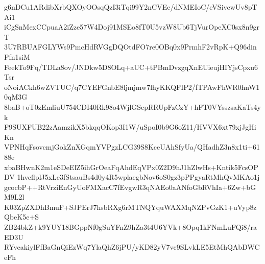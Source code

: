 g6nDCu1ARdibXrbQXOyOOsqQzI3iTqi99Y2nCVEe/dNMEIoC/eVSivcwUv8pTAi1
iCgSnMexCCpuaA2iZze57W4Doj91MSEo8fT0U5vzW8Ub6TjVurOpeXC0sx8n9grT
3U7RBUAFGLYWs9PmcHdRVGgDQOtdFO7re0OBq0x9PrmhF2vRpK+Q96dinPfn1siM
FeekTo9Fq/TDLa8ov/JNDkw5D8OLq+aUC+tPBmDvzgqXnEUieujHIYjsCpxu6Tsr
oNoiACkh6wZVTUC/q7CYEFGnbE8ljmjmw7lhyKKQFIP2/fTPAwFhWR0hnW10qM3G
8baB+oT0zEmliuU754CDI40Rk98o4WjlGScpRRUpFzCzY+hFT0VYsszsaKaTs4yk
F9SUXFUB22zAamzikX5bkqqOKop3I1W/uSpoI0b9G6oZ11/HVVX6xt79xjJgHiKn
VPNHqFsovcmjGokZnXGqmYVPgzLCG39S8KceUAhSfyUa/QHadhZ3n8x1ti+6188e
xbaBHwnK2m1eSDeElZ5ihGrOeaFqAhdEqVPx0Z2D9hJ1hZlwHs+Kntik5FcsOPDV
1hvcflplJ5xLe3fStsauBs4d0y4R5wplaegbNov6oS0gz3pPPgyaRtMhQvMKAo1j
gcocbP++RtVrziEnGyUoFMXacC7fEvgwR3qNAEo0aANfoGbRVhIa+6Zw+bGM9L2l
K03ZpZXDhBmuF+SJPErJ7hsbRXg6rMTNQYquWAXMqNZPvGzK1+uVyp8zQbeK5e+S
ZB24bkZ+k9YUY18BGppNf0gSuYFnZ9hZa3t4U6YVk+8Opq1kFNmLuFQi8/raED3U
RYvcakiylFfBaGnQiEzWq7YlaQhZ6jPU/yKD82yV7vc9SLvkLE5EtMhQAbDWCeFh
